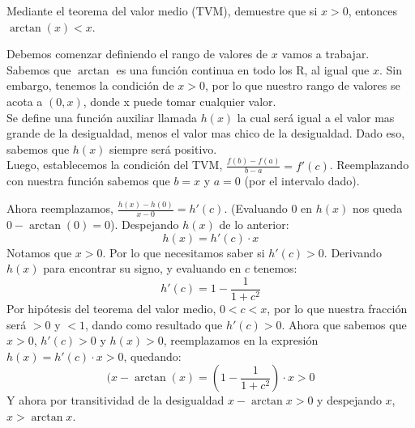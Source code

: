 \question 
Mediante el teorema del valor medio (TVM), demuestre que si $x > 0$, entonces $\arctan(x) < x$.
\begin{solution}
Debemos comenzar definiendo el rango de valores de $x$ vamos a trabajar. Sabemos que $\arctan$ es una función continua en todo los R, al igual que $x$. Sin embargo, tenemos la condición de $x > 0$, por lo que nuestro rango de valores se acota a $(0, x)$, donde x puede tomar cualquier valor. \\

Se define una función auxiliar llamada $h(x)$ la cual será igual a el valor mas grande de la desigualdad, menos el valor mas chico de la desigualdad. Dado eso, sabemos que $h(x)$ siempre será positivo. \\

Luego, establecemos la condición del TVM, $\frac{f(b) - f(a)}{b - a } = f'(c)$. Reemplazando con nuestra función sabemos que $b = x$ y $a = 0$ (por el intervalo dado).

Ahora reemplazamos, $\frac{h(x) - h(0)}{x-0} = h'(c)$. (Evaluando 0 en $h(x)$ nos queda $0 - \arctan(0) = 0$). Despejando $h(x)$ de lo anterior:
$$h(x) = h'(c) \cdot x$$
Notamos que $x > 0$. Por lo que necesitamos saber si $h'(c) > 0$.
Derivando $h(x)$ para encontrar su signo, y evaluando en $c$ tenemos: 
$$h'(c) = 1 - \frac{1}{1 + c^2}$$Por hipótesis del teorema del valor medio, $0 < c < x$, por lo que nuestra fracción será $>0$ y $<1$, dando como resultado que $h'(c) > 0$.  Ahora que sabemos que $x>0$, $h'(c) > 0$ y $h(x) > 0$, reemplazamos en la expresión $h(x) = h'(c) \cdot x > 0$, quedando: $$(x - \arctan(x) = (1 - \frac{1}{1 + c^2})\cdot x > 0$$Y ahora por transitividad de la desigualdad $x - \arctan x > 0$ y despejando $x$, $x > \arctan x$.
\end{solution}